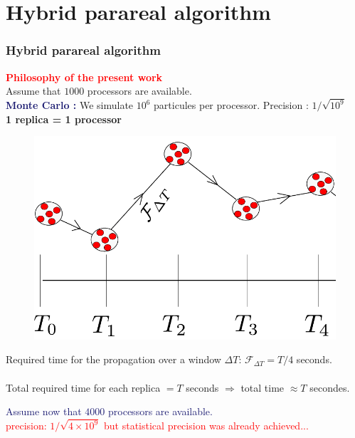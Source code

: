 \documentclass[aspectratio=169]{beamer}
\begin{document}
\section{Hybrid parareal algorithm}
\begin{frame}
  \frametitle{Hybrid parareal algorithm}
  \textcolor{red}{\textbf{Philosophy of the present work}}
  \\
  \vspace*{0.15 cm}
  Assume that $1000$ processors are available.
  \\
  \vspace*{0.15 cm}
\textcolor{midnightblue}{\textbf{Monte Carlo :}}  We simulate $10^6$ particules per processor. Precision : $1/\sqrt{10^9}$
\\
\vspace*{0.2 cm}
\textcolor{cadmiumgreen}{\textbf{1 replica = 1 processor}}
\\
\vspace*{0.2 cm}
\begin{minipage}{0.6 \textwidth}
\begin{figure}
\includegraphics[scale=0.42]{image/image_MC-cropped}
\end{figure}
\end{minipage}
\hfill
\begin{minipage}{0.38 \textwidth}
  Required time for the propagation over a window $\Delta T$: $\mathcal{F}_{\Delta T} = T/4$ seconds.
  \\\\
Total required time for each replica $=T$ seconds $\Rightarrow$ total time $ \approx T$ secondes.
\end{minipage}
\textcolor{midnightblue}{Assume now that $4000$ processors are available.}
\\
\vspace{0.15 cm}
\textcolor{red}{precision: $1/\sqrt{4 \times 10^{9}}$ but statistical precision was already achieved... }
\end{frame}
\end{document}
